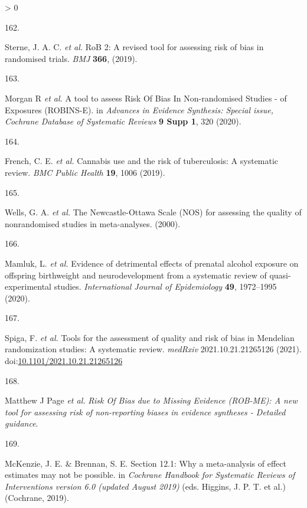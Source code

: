 \documentclass[a4paper, twoside]{templates/ociamthesis}
\newlength{\cslhangindent}
\newlength{\csllabelwidth}
\newenvironment{CSLReferences}[3] %
 {%
  \setlength{\parindent}{0pt}
  \ifodd #1 \everypar{\setlength{\hangindent}{\cslhangindent}}\ignorespaces\fi
  \ifnum #2 > 0
  \setlength{\parskip}{#2\baselineskip}
  \fi
 }%
 {}
\newcommand{\CSLLeftMargin}[1]{\parbox[t]{\maxof{\widthof{#1}}{\csllabelwidth}}{#1}}
\newcommand{\CSLRightInline}[1]{\parbox[t]{\linewidth - \csllabelwidth}{#1}}
\begin{document}
\begin{CSLReferences}{0}{0}
\leavevmode\hypertarget{ref-sterne2019}{}%
\CSLLeftMargin{162. }
\CSLRightInline{Sterne, J. A. C. \emph{et al.} {RoB} 2: A revised tool for assessing risk of bias in randomised trials. \emph{BMJ} \textbf{366}, (2019).}

\leavevmode\hypertarget{ref-morganr2020}{}%
\CSLLeftMargin{163. }
\CSLRightInline{Morgan R \emph{et al.} A tool to assess {Risk Of Bias In Non}-randomised {Studies} - of {Exposures} ({ROBINS}-{E}). in \emph{Advances in {Evidence Synthesis}: Special issue, {Cochrane Database} of {Systematic Reviews}} \textbf{9 Supp 1}, 320 (2020).}

\leavevmode\hypertarget{ref-french2019}{}%
\CSLLeftMargin{164. }
\CSLRightInline{French, C. E. \emph{et al.} Cannabis use and the risk of tuberculosis: A systematic review. \emph{BMC Public Health} \textbf{19}, 1006 (2019).}

\leavevmode\hypertarget{ref-wells2000}{}%
\CSLLeftMargin{165. }
\CSLRightInline{Wells, G. A. \emph{et al.} The {Newcastle}-{Ottawa Scale} ({NOS}) for assessing the quality of nonrandomised studies in meta-analyses. (2000).}

\leavevmode\hypertarget{ref-mamluk2020}{}%
\CSLLeftMargin{166. }
\CSLRightInline{Mamluk, L. \emph{et al.} Evidence of detrimental effects of prenatal alcohol exposure on offspring birthweight and neurodevelopment from a systematic review of quasi-experimental studies. \emph{International Journal of Epidemiology} \textbf{49}, 1972--1995 (2020).}

\leavevmode\hypertarget{ref-spiga2021}{}%
\CSLLeftMargin{167. }
\CSLRightInline{Spiga, F. \emph{et al.} Tools for the assessment of quality and risk of bias in {Mendelian} randomization studies: A systematic review. \emph{medRxiv} 2021.10.21.21265126 (2021). doi:\href{https://doi.org/10.1101/2021.10.21.21265126}{10.1101/2021.10.21.21265126}}

\leavevmode\hypertarget{ref-zotero-15123}{}%
\CSLLeftMargin{168. }
\CSLRightInline{Matthew J Page \emph{et al.} \emph{Risk {Of Bias} due to {Missing Evidence} ({ROB}-{ME}): A new tool for assessing risk of non-reporting biases in evidence syntheses - {Detailed} guidance}.}

\leavevmode\hypertarget{ref-mckenzie2019}{}%
\CSLLeftMargin{169. }
\CSLRightInline{McKenzie, J. E. \& Brennan, S. E. Section 12.1: Why a meta-analysis of effect estimates may not be possible. in \emph{Cochrane {Handbook} for {Systematic Reviews} of {Interventions} version 6.0 (updated {August} 2019)} (eds. Higgins, J. P. T. et al.) ({Cochrane}, 2019).}


\end{CSLReferences}
\end{document}
